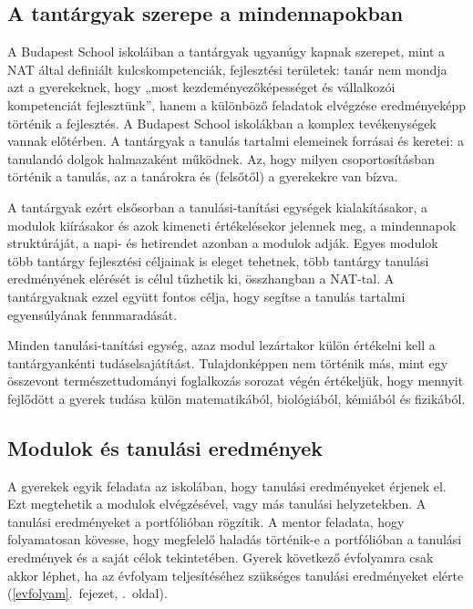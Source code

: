 \hypertarget{a-tantargyak-szerepe-a-mindennapokban}{%
\subsection{A tantárgyak szerepe a
mindennapokban}\label{a-tantargyak-szerepe-a-mindennapokban}}

A Budapest School iskoláiban a tantárgyak ugyanúgy kapnak szerepet, mint
a NAT által definiált kulcskompetenciák, fejlesztési területek: tanár
nem mondja azt a gyerekeknek, hogy „most kezdeményezőképességet és
vállalkozói kompetenciát fejlesztünk'', hanem a különböző feladatok
elvégzése eredményeképp történik a fejlesztés. A Budapest School
iskolákban a komplex tevékenységek vannak előtérben. A tantárgyak a
tanulás tartalmi elemeinek forrásai és keretei: a tanulandó dolgok
halmazaként működnek. Az, hogy milyen csoportosításban történik a
tanulás, az a tanárokra és (felsőtől) a gyerekekre van bízva.

A tantárgyak ezért elsősorban a tanulási-tanítási egységek
kialakításakor, a modulok kiírásakor és azok kimeneti értékelésekor
jelennek meg, a mindennapok struktúráját, a napi- és hetirendet azonban
a modulok adják. Egyes modulok több tantárgy fejlesztési céljainak is
eleget tehetnek, több tantárgy tanulási eredményének elérését is célul
tűzhetik ki, összhangban a NAT-tal. A tantárgyaknak ezzel együtt fontos
célja, hogy segítse a tanulás tartalmi egyensúlyának fennmaradását.

Minden tanulási-tanítási egység, azaz modul lezártakor külön értékelni
kell a tantárgyankénti tudáselsajátítást. Tulajdonképpen nem történik
más, mint egy összevont természettudományi foglalkozás sorozat végén
értékeljük, hogy mennyit fejlődött a gyerek tudása külön matematikából,
biológiából, kémiából és fizikából.

\hypertarget{modulok-es-tanulasi-eredmenyek}{%
\subsection{Modulok és tanulási
eredmények}\label{modulok-es-tanulasi-eredmenyek}}

A gyerekek egyik feladata az iskolában, hogy tanulási eredményeket
érjenek el. Ezt megtehetik a modulok elvégzésével, vagy más tanulási
helyzetekben. A tanulási eredményeket a portfólióban rögzítik. A mentor
feladata, hogy folyamatosan kövesse, hogy megfelelő haladás történik-e a
portfólióban a tanulási eredmények és a saját célok tekintetében. Gyerek
következő évfolyamra csak akkor léphet, ha az
évfolyam teljesítéséhez szükséges tanulási eredményeket elérte (\ref{evfolyam}.~fejezet, \pageref{evfolyam}.~oldal).

